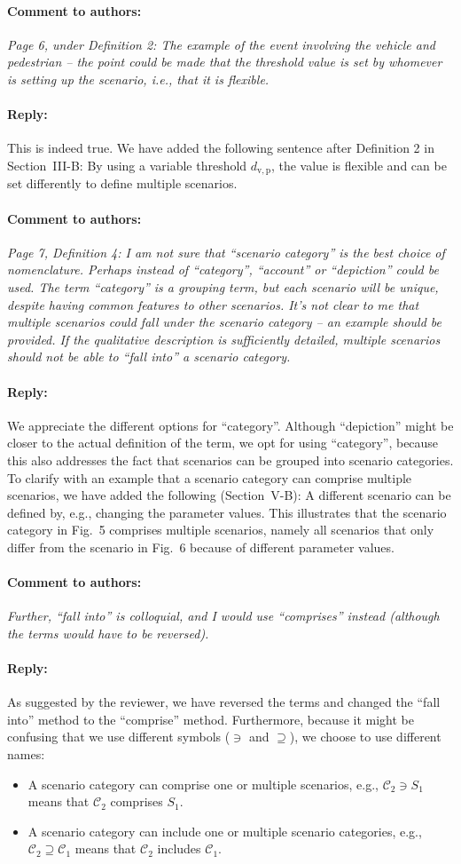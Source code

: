 \documentclass[10pt,final,a4paper,oneside,onecolumn]{article}
\newcommand{\toauthor}{\paragraph*{Comment to authors:} \itshape}
\newcommand{\fromauthor}{\paragraph*{Reply:} \normalfont}
\newcommand{\cstart}{\cbstart\color{red}}
\newcommand{\cend}{\cbend\color{black}}
\newcommand{\distancecondition}{d_{\mathrm{v,p}}}
\newcommand{\scenario}{S}
\newcommand{\scenarioa}{\scenario_{1}}
\newcommand{\comprises}{\ni}
\newcommand{\scenariocategory}{\mathcal{C}}
\newcommand{\scenariocategorya}{\scenariocategory_{1}}
\newcommand{\scenariocategoryb}{\scenariocategory_{2}}
\newcommand{\includes}{\supseteq}
\begin{document}
\toauthor Page 6, under Definition 2: The example of the event involving the vehicle and pedestrian -- the point could be made that the threshold value is set by whomever is setting up the scenario, i.e., that it is flexible.

\fromauthor This is indeed true. We have added the following sentence after Definition 2 in Section~III-B: \cstart By using a variable threshold $\distancecondition$, the value is flexible and can be set differently to define multiple scenarios.\cend



\toauthor Page 7, Definition 4: I am not sure that ``scenario category'' is the best choice of nomenclature. Perhaps instead of ``category'', ``account'' or ``depiction'' could be used. The term ``category'' is a grouping term, but each scenario will be unique, despite having common features to other scenarios. It's not clear to me that multiple scenarios could fall under the scenario category -- an example should be provided. If the qualitative description is sufficiently detailed, multiple scenarios should not be able to ``fall into'' a scenario category.

\fromauthor We appreciate the different options for ``category''. Although ``depiction'' might be closer to the actual definition of the term, we opt for using ``category'', because this also addresses the fact that scenarios can be grouped into scenario categories. To clarify with an example that a scenario category can comprise multiple scenarios, we have added the following (Section~V-B): \cstart A different scenario can be defined by, e.g., changing the parameter values. This illustrates that the scenario category in Fig.~5 comprises multiple scenarios, namely all scenarios that only differ from the scenario in Fig.~6 because of different parameter values.\cend

\toauthor Further, ``fall into'' is colloquial, and I would use ``comprises'' instead (although the terms would have to be reversed).

\fromauthor As suggested by the reviewer, we have reversed the terms and changed the ``fall into'' method to the ``\cstart comprise\cend'' method. Furthermore, because it might be confusing that we use different symbols ($\comprises$ and $\includes$), we choose to use different names:
\begin{itemize}
	\item A scenario category can \cstart comprise \cend one or multiple scenarios, e.g., $\scenariocategoryb \comprises \scenarioa$ means that $\scenariocategoryb$ \cstart comprises \cend $\scenarioa$.
	\item A scenario category can \cstart include \cend one or multiple scenario categories, e.g., $\scenariocategoryb \includes \scenariocategorya$ means that $\scenariocategoryb$ \cstart includes \cend $\scenariocategorya$.
\end{itemize}
\end{document}
